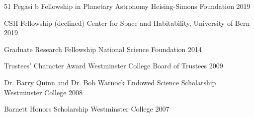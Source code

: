 

\begin{cvhonors}

  \cvhonor
    {51 Pegasi b Fellowship in Planetary Astronomy} %
    {Heising-Simons Foundation} %
    {} %
    {2019} %

  \cvhonor
    {CSH Fellowship (declined)} %
    {Center for Space and Habitability, University of Bern} %
    {} %
    {2019} %
    
  \cvhonor
    {Graduate Research Fellowship} %
    {National Science Foundation} %
    {} %
    {2014} %

  \cvhonor
    {Trustees' Character Award} %
    {Westminster College Board of Trustees} %
    {} %
    {2009} %

  \cvhonor
    {Dr. Barry Quinn and Dr. Bob Warnock Endowed Science Scholarship} %
    {Westminster College} %
    {} %
    {2008} %

\cvhonor
    {Barnett Honors Scholarship} %
    {Westminster College} %
    {} %
    {2007} %
    
\end{cvhonors}